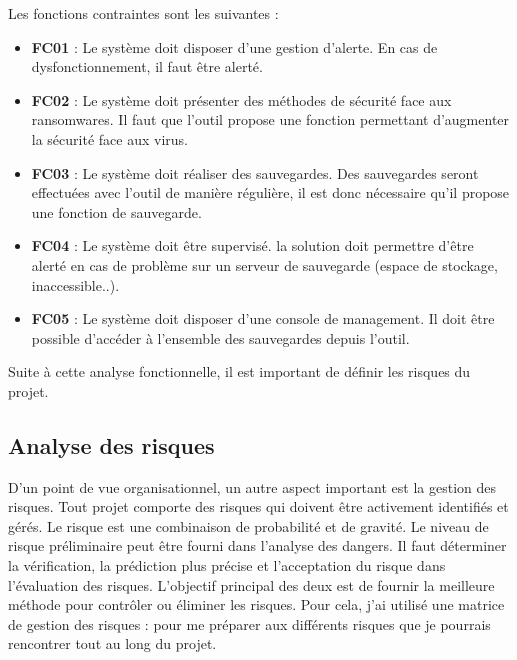 \documentclass[pfe]{tnreport} %
\begin{document}
Les fonctions contraintes sont les suivantes : \newline
\begin{itemize}
\item \textbf{FC01} : Le système doit disposer d'une gestion d'alerte. \newline
En cas de dysfonctionnement, il faut être alerté. \newline
\item \textbf{FC02} : Le système doit présenter des méthodes de sécurité face aux ransomwares. 
Il faut que l'outil propose une fonction permettant d'augmenter la sécurité face aux virus. \newline
\item \textbf{FC03} : Le système doit réaliser des sauvegardes. 
\newline Des sauvegardes seront effectuées avec l'outil de manière régulière, il est donc nécessaire qu'il propose une fonction de sauvegarde. \newline
\item \textbf{FC04} : Le système doit être supervisé.
la solution doit permettre d'être alerté en cas de problème sur un serveur de sauvegarde (espace de stockage, inaccessible..). \newline
\item \textbf{FC05} : Le système doit disposer d'une console de management.
Il doit être possible d'accéder à l'ensemble des sauvegardes depuis l'outil. \newline
\end{itemize}

Suite à cette analyse fonctionnelle, il est important de définir les risques du projet. \newpage

\subsection{Analyse des risques}

D'un point de vue organisationnel, un autre aspect important est la gestion des risques.\newline
Tout projet comporte des risques qui doivent être activement identifiés et gérés. \newline
Le risque est une combinaison de probabilité et de gravité. Le niveau de risque préliminaire peut être fourni dans l'analyse des dangers. Il faut déterminer la vérification, la prédiction plus précise et l'acceptation du risque dans l'évaluation des risques. L'objectif principal des deux est de fournir la meilleure méthode pour contrôler ou éliminer les risques. \newline
Pour cela, j'ai utilisé une matrice de gestion des risques : pour me préparer aux différents risques que je pourrais rencontrer tout au long du projet. 
\end{document}
